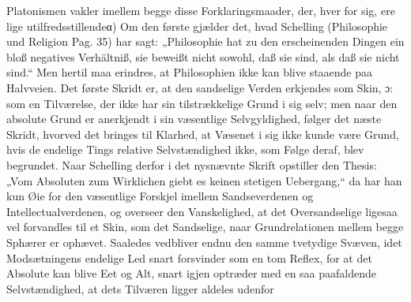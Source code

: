 \documentclass[12pt]{book}
\newcommand{\dsi}{\textup{ɔ:}}
\newcommand{\opage}[1]{\marginnote{\footnotesize\textit{[#1]}}}
\begin{document}
Platonismen vakler imellem begge disse Forklaringsmaader, der, hver for sig, ere lige
utilfredsstillende\quad α) Om den første gjælder det, hvad Schelling (Philosophie und Religion
Pag. 35) har sagt: „Philosophie hat zu den erscheinenden Dingen ein bloß negatives Verhältniß,
sie beweißt nicht sowohl, daß sie sind, als daß sie nicht sind.“ Men hertil maa erindres, at
Philosophien ikke kan blive staaende paa Halvveien. Det første Skridt er, at den sandselige
Verden erkjendes som Skin, \dsi{} som en Tilværelse, der ikke har sin tilstrækkelige Grund i sig
selv; men naar den absolute Grund er anerkjendt i sin væsentlige Selvgyldighed, følger det næste
Skridt, hvorved det bringes til Klarhed, at Væsenet i sig ikke kunde være Grund, hvis de
endelige Tings relative Selvstændighed ikke, som Følge deraf, blev begrundet. Naar
\opage{135} %
Schelling derfor i det nysnævnte Skrift opstiller den Thesis: „Vom Absoluten zum Wirklichen
giebt es keinen stetigen Uebergang,“ da har han kun Øie for den væsentlige Forskjel imellem
Sandseverdenen og Intellectualverdenen, og overseer den Vanskelighed, at det Oversandselige
ligesaa vel forvandles til et Skin, som det Sandselige, naar Grundrelationen mellem begge
Sphærer er ophævet. Saaledes vedbliver endnu den samme tvetydige Svæven, idet Modsætningens
endelige Led snart forsvinder som en tom Reflex, for at det Absolute kan blive Eet og Alt, snart
igjen optræder med en saa paafaldende Selvstændighed, at dets Tilværen ligger aldeles udenfor
\end{document}
